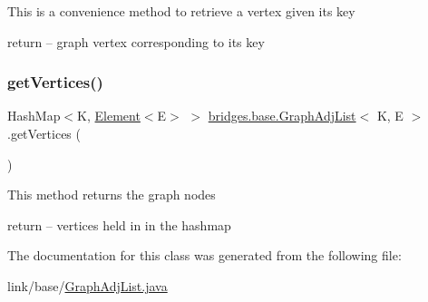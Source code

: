 This is a convenience method to retrieve a vertex given its key

return -- graph vertex corresponding to its key \hypertarget{classbridges_1_1base_1_1_graph_adj_list_a19abf0bd09f0420e61cc144aec141f0a}{}\label{classbridges_1_1base_1_1_graph_adj_list_a19abf0bd09f0420e61cc144aec141f0a} 
\subsubsection{\texorpdfstring{get\+Vertices()}{getVertices()}}
{\footnotesize\ttfamily Hash\+Map$<$K, \hyperlink{classbridges_1_1base_1_1_element}{Element}$<$E$>$ $>$ \hyperlink{classbridges_1_1base_1_1_graph_adj_list}{bridges.\+base.\+Graph\+Adj\+List}$<$ K, E $>$.get\+Vertices (\begin{DoxyParamCaption}{ }\end{DoxyParamCaption})}

This method returns the graph nodes

return -- vertices held in in the hashmap 

The documentation for this class was generated from the following file\+:\begin{DoxyCompactItemize}
\item 
link/base/\hyperlink{_graph_adj_list_8java}{Graph\+Adj\+List.\+java}\end{DoxyCompactItemize}
